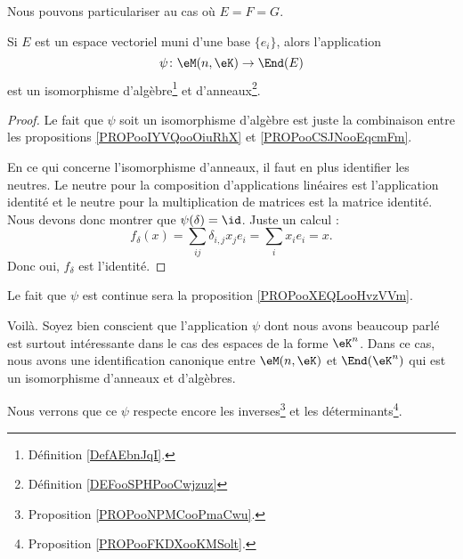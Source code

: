 Nous pouvons particulariser au cas où \( E=F=G\).
\begin{proposition}     \label{PROPooFMBFooEVCLKA}
	Si \( E\) est un espace vectoriel muni d'une base \( \{ e_i \}\), alors l'application
	\begin{equation}
		\psi\colon \eM(n,\eK)\to \End(E)
	\end{equation}
	est un isomorphisme d'algèbre\footnote{Définition \ref{DefAEbnJqI}.} et d'anneaux\footnote{Définition \ref{DEFooSPHPooCwjzuz}}.
\end{proposition}

\begin{proof}
	Le fait que \( \psi\) soit un isomorphisme d'algèbre est juste la combinaison entre les propositions \ref{PROPooIYVQooOiuRhX} et \ref{PROPooCSJNooEqcmFm}.

	En ce qui concerne l'isomorphisme d'anneaux, il faut en plus identifier les neutres. Le neutre pour la composition d'applications linéaires est l'application identité et le neutre pour la multiplication de matrices est la matrice identité. Nous devons donc montrer que \( \psi(\delta)=\id\). Juste un calcul :
	\begin{equation}
		f_{\delta}(x)=\sum_{ij}\delta_{i,j}x_je_i=\sum_ix_ie_i=x.
	\end{equation}
	Donc oui, \( f_{\delta}\) est l'identité.
\end{proof}


Le fait que \( \psi\) est continue sera la proposition \ref{PROPooXEQLooHvzVVm}.


Voilà. Soyez bien conscient que l'application \( \psi\) dont nous avons beaucoup parlé est surtout intéressante dans le cas des espaces de la forme \( \eK^n\). Dans ce cas, nous avons une identification canonique entre \( \eM(n,\eK)\) et \( \End(\eK^n)\) qui est un isomorphisme d'anneaux et d'algèbres.

Nous verrons que ce \( \psi\) respecte encore les inverses\footnote{Proposition \ref{PROPooNPMCooPmaCwu}.} et les déterminants\footnote{Proposition \ref{PROPooFKDXooKMSolt}.}.

